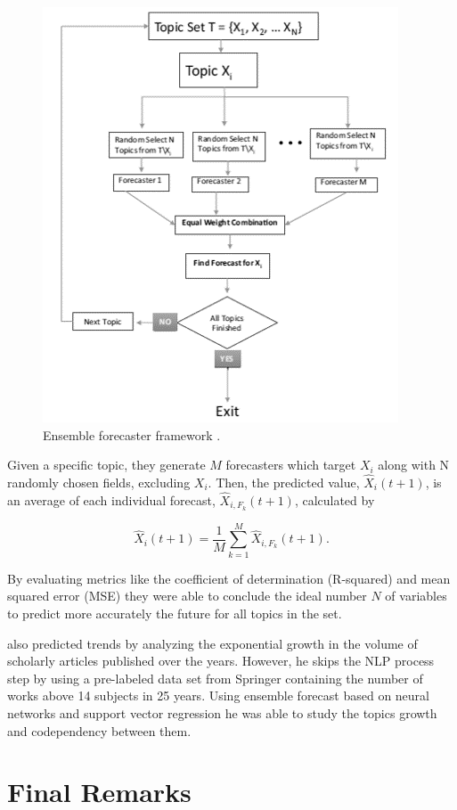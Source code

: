 \begin{figure}[h!]
	\centering
	\includegraphics[width=0.5\linewidth]{01.Chapters/03.RelatedWorks/ensemble-forecasting-framework}
	\caption{Ensemble forecaster framework \cite{hurtado2016topic}.}
	\label{fig:ensemble-forecasting-framework}
\end{figure}

Given a specific topic, they generate $M$ forecasters which target $X_{i}$ along with N randomly chosen fields, excluding $X_{i}$. Then, the predicted value, $\hat{X}_{i}(t+1)$, is an average of each individual forecast, $\hat{X}_{i, F_{k}}(t+1)$, calculated by 

\begin{equation}
	\hat{X}_{i}(t+1) = \dfrac{1}{M} \sum_{k=1}^{M}\hat{X}_{i, F_{k}}(t+1)\text{.}
\end{equation}

By evaluating metrics like the coefficient of determination (R-squared) and mean squared error (MSE) they were able to conclude the ideal number $N$ of variables to predict more accurately the future for all topics in the set.

 also predicted trends by analyzing the exponential growth in the volume of scholarly articles published over the years. However, he skips the NLP process step by using a pre-labeled data set from Springer containing the number of works above 14 subjects in 25 years. Using ensemble forecast based on neural networks and support vector regression he was able to study the topics growth and codependency between them.


\section{Final Remarks}

